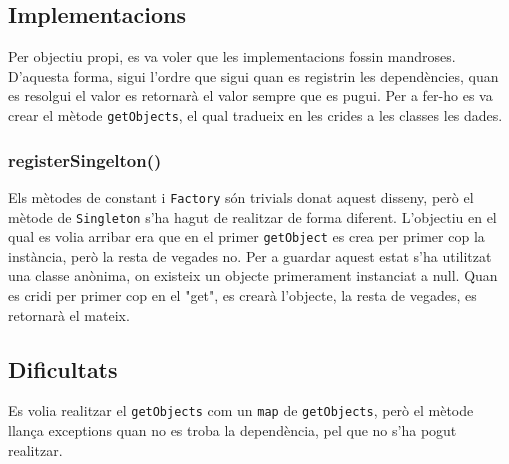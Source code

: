 \subsection{Implementacions}
Per objectiu propi, es va voler que les implementacions fossin mandroses. D'aquesta forma, sigui l'ordre que sigui quan
es registrin les dependències, quan es resolgui el valor es retornarà el valor sempre que es pugui. Per a fer-ho es va
crear el mètode \texttt{getObjects}, el qual tradueix en les crides a les classes les dades.
\subsubsection{registerSingelton()}
Els mètodes de constant i  \texttt{Factory} són trivials donat aquest disseny, però el mètode de \texttt{Singleton} s'ha
hagut de realitzar de forma diferent. L'objectiu en el qual es volia arribar era que en el primer \texttt{getObject} es
crea per primer cop la instància, però la resta de vegades no. Per a guardar aquest estat s'ha utilitzat una classe anònima,
on existeix un objecte primerament instanciat a null. Quan es cridi per primer cop en el "get", es crearà l'objecte, la resta
de vegades, es retornarà el mateix.
\subsection{Dificultats}
Es volia realitzar el \texttt{getObjects} com un \texttt{map} de \texttt{getObjects}, però el mètode llança exceptions
quan no es troba la dependència, pel que no s'ha pogut realitzar.

